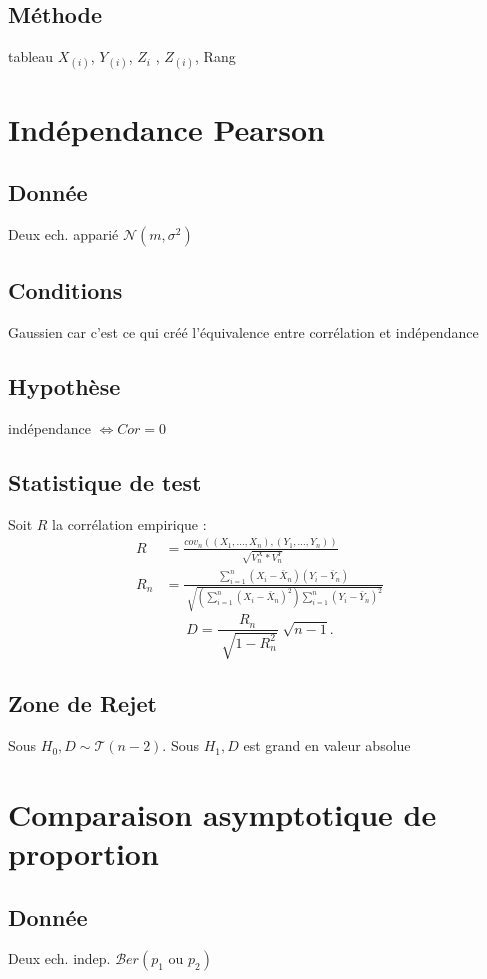 \documentclass[9pt]{article}
\theoremstyle{plain}%
\theoremstyle{definition}
\theoremstyle{remark}
\begin{document}
\begin{multicols}{3}
\subsection*{Méthode}
tableau $X_{(i)}$, $Y_{(i)}$, $Z_i$ , $Z_{(i)}$, Rang

\section{Indépendance Pearson}
\subsection*{Donnée}
Deux ech. apparié $ \mathcal{N}(m,\sigma ^2) $ 

\subsection*{Conditions}
Gaussien car c'est ce qui créé l'équivalence entre corrélation et indépendance

\subsection*{Hypothèse}
indépendance $\Leftrightarrow Cor = 0$

\subsection*{Statistique de test}
Soit $ R $ la corrélation empirique :
\begin{align*}
    R &= \frac{cov_n( (X_1, \dots, X_n), (Y_1, \dots, Y_n) )}{\sqrt[]{V_n^X*V_n^Y}} \\
    R_n &= \frac{\sum_{i=1}^{n} (X_i - \bar{X}_n) (Y_i - \bar{Y}_n)}{\sqrt[]{(\sum_{i=1}^{n} (X_i - \bar{X}_n)^2) \sum_{i=1}^{n} (Y_i - \bar{Y}_n)^2 }}
\end{align*}
\[
    D = \frac{R_n}{\sqrt[]{1 - R_n^2}} \sqrt[]{n-1}
.\]

\subsection*{Zone de Rejet}
Sous $ H_0, D \sim \mathcal{T}(n-2) $. Sous $ H_1, D $ est grand en valeur absolue

\section{Comparaison asymptotique de proportion}
\subsection*{Donnée}
Deux ech. indep. $ \mathcal{B}er(p_1 \text{ ou } p_2) $ 


\end{multicols}
\end{document}
